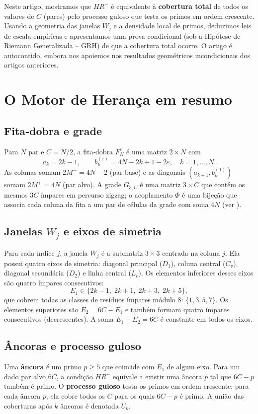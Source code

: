 \documentclass[11pt]{article}
\theoremstyle{definition}
\begin{document}
	Neste artigo, mostramos que $HR^-$ é equivalente à \textbf{cobertura total} de todos os valores de $C$ (pares) pelo processo guloso que testa os primos em ordem crescente. Usando a geometria das janelas $W_j$ e a densidade local de primos, deduzimos leis de escala empíricas e apresentamos uma prova condicional (sob a Hipótese de Riemann Generalizada – GRH) de que a cobertura total ocorre. O artigo é autocontido, embora nos apoiemos nos resultados geométricos incondicionais dos artigos anteriores.
	
	\section{O Motor de Herança em resumo}
	
	\subsection{Fita‑dobra e grade}
	Para $N$ par e $C = N/2$, a fita‑dobra $F_N^\varepsilon$ é uma matriz $2\times N$ com
	\[
	a_k = 2k-1,\qquad b_k^{(\varepsilon)} = 4N-2k+1-2\varepsilon,\quad k=1,\dots,N.
	\]
	As colunas somam $2M^- = 4N-2$ (par base) e as diagonais $(a_{k+1},b_k^{(1)})$ somam $2M^+ = 4N$ (par alvo). A grade $G_{3,C}$ é uma matriz $3\times C$ que contém os mesmos $3C$ ímpares em percurso zigzag; o acoplamento $\Phi$ é uma bijeção que associa cada coluna da fita a um par de células da grade com soma $4N$ (ver \cite{art7}).
	
	\subsection{Janelas $W_j$ e eixos de simetria}
	Para cada índice $j$, a janela $W_j$ é a submatriz $3\times3$ centrada na coluna $j$. Ela possui quatro eixos de simetria: diagonal principal ($D_1$), coluna central ($C_v$), diagonal secundária ($D_2$) e linha central ($L_c$). Os elementos inferiores desses eixos são quatro ímpares consecutivos:
	\[
	E_1 \in \{2k-1,\;2k+1,\;2k+3,\;2k+5\},
	\]
	que cobrem todas as classes de resíduos ímpares módulo $8$: $\{1,3,5,7\}$. Os elementos superiores são $E_2 = 6C - E_1$ e também formam quatro ímpares consecutivos (decrescentes). A soma $E_1+E_2 = 6C$ é constante em todos os eixos.
	
	\subsection{Âncoras e processo guloso}
	Uma \textbf{âncora} é um primo $p\ge5$ que coincide com $E_1$ de algum eixo. Para um dado par alvo $6C$, a condição $HR^-$ equivale a existir uma âncora $p$ tal que $6C-p$ também é primo. O \textbf{processo guloso} testa os primos em ordem crescente; para cada âncora $p$, ela cobre todos os $C$ para os quais $6C-p$ é primo. A união das coberturas após $k$ âncoras é denotada $U_k$.
	
\end{document}
